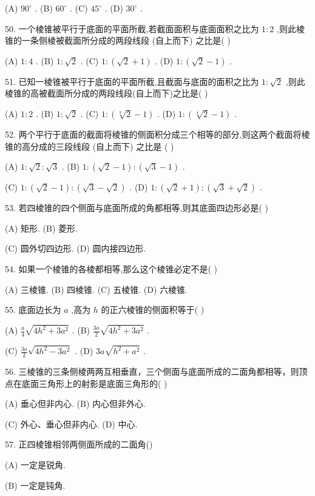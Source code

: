 \documentclass[10pt]{article}
\begin{document}
(A) \({90}^{ \circ  }\) . (B) \({60}^{ \circ  }\) . (C) \({45}^{ \circ  }\) . (D) \({30}^{ \circ  }\) .

50. 一个棱锥被平行于底面的平面所截,若截面面积与底面面积之比为 \(1 : 2\) ,则此棱锥的一条侧棱被截面所分成的两段线段 (自上而下) 之比是( )

(A) \(1 : 4\) . (B) \(1 : \sqrt{2}\) . (C) \(1 : \left( {\sqrt{2} + 1}\right)\) . (D) \(1 : \left( {\sqrt{2} - 1}\right)\) .

51. 已知一棱锥被平行于底面的平面所截,且截面与底面的面积之比为 \(1 : \sqrt{2}\) ,则此棱锥的高被截面所分成的两段线段(自上而下)之比是( )

(A) \(1 : 2\) . (B) \(1 : \sqrt{2}\) . (C) \(1 : \left( {\sqrt[3]{2} - 1}\right)\) . (D) \(1 : \left( {\sqrt[4]{2} - 1}\right)\) .

52. 两个平行于底面的截面将棱锥的侧面积分成三个相等的部分,则这两个截面将棱锥的高分成的三段线段 (自上而下) 之比是 ( )

(A) \(1 : \sqrt{2} : \sqrt{3}\) . (B) \(1 : \left( {\sqrt{2} - 1}\right)  : \left( {\sqrt{3} - 1}\right)\) .

(C) \(1 : \left( {\sqrt{2} - 1}\right)  : \left( {\sqrt{3} - \sqrt{2}}\right)\) . (D) \(1 : \left( {\sqrt{2} + 1}\right)  : \left( {\sqrt{3} + \sqrt{2}}\right)\) .

53. 若四棱锥的四个侧面与底面所成的角都相等,则其底面四边形必是( )

(A) 矩形. (B) 菱形.

(C) 圆外切四边形. (D) 圆内接四边形.

54. 如果一个棱锥的各棱都相等,那么这个棱锥必定不是( )

(A) 三棱锥. (B) 四棱锥. (C) 五棱锥. (D) 六棱锥.

55. 底面边长为 \(a\) ,高为 \(h\) 的正六棱锥的侧面积等于( )

(A) \(\frac{a}{4}\sqrt{4{h}^{2} + 3{a}^{2}}\) . (B) \(\frac{3a}{2}\sqrt{4{h}^{2} + 3{a}^{2}}\) .

(C) \(\frac{3a}{2}\sqrt{4{h}^{2} - 3{a}^{2}}\) . (D) \({3a}\sqrt{{h}^{2} + {a}^{2}}\) .

56. 三棱锥的三条侧棱两两互相垂直，三个侧面与底面所成的二面角都相等，则顶点在底面三角形上的射影是底面三角形的( )

(A) 垂心但非内心. (B) 内心但非外心.

(C) 外心、垂心但非内心. (D) 中心.

57. 正四棱锥相邻两侧面所成的二面角()

(A) 一定是锐角.

(B) 一定是钝角.
\end{document}

